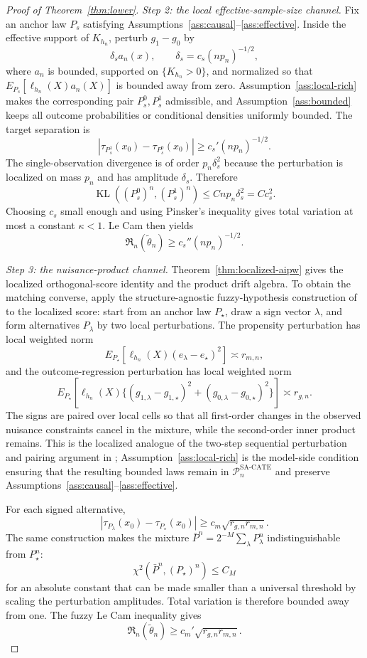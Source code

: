 \documentclass[11pt]{article}
\theoremstyle{definition}
\theoremstyle{plain}
\theoremstyle{remark}
\begin{document}
\begin{proof}[Proof of Theorem~\ref{thm:lower}]
\emph{Step 2: the local effective-sample-size channel.}
Fix an anchor law $P_s$ satisfying Assumptions~\ref{ass:causal}--\ref{ass:effective}. Inside the effective support of $K_{h_n}$, perturb $g_1-g_0$ by
\[
  \delta_s a_n(x),\qquad
  \delta_s=c_s(n p_n)^{-1/2},
\]
where $a_n$ is bounded, supported on $\{K_{h_n}>0\}$, and normalized so that
$E_{P_s}[\ell_{h_n}(X)a_n(X)]$ is bounded away from zero. Assumption~\ref{ass:local-rich} makes the corresponding pair $P_s^0,P_s^1$ admissible, and Assumption~\ref{ass:bounded} keeps all outcome probabilities or conditional densities uniformly bounded. The target separation is
\[
  |\tau_{P_s^1}(x_0)-\tau_{P_s^0}(x_0)|
  \ge c_s'(n p_n)^{-1/2}.
\]
The single-observation divergence is of order $p_n\delta_s^2$ because the perturbation is localized on mass $p_n$ and has amplitude $\delta_s$. Therefore
\[
  \operatorname{KL}\!\left((P_s^0)^n,(P_s^1)^n\right)
  \le C n p_n\delta_s^2
  = Cc_s^2 .
\]
Choosing $c_s$ small enough and using Pinsker's inequality gives total variation at most a constant $\kappa<1$. Le Cam then yields
\[
  \mathfrak R_n(\tilde\theta_n)\ge c_s''(n p_n)^{-1/2}.
\]

\emph{Step 3: the nuisance-product channel.}
Theorem~\ref{thm:localized-aipw} gives the localized orthogonal-score identity and the product drift algebra. To obtain the matching converse, apply the structure-agnostic fuzzy-hypothesis construction of \citet{JinSyrgkanis2025GeneralLinearFunctionalLowerBounds} to the localized score: start from an anchor law $P_\star$, draw a sign vector $\lambda$, and form alternatives $P_\lambda$ by two local perturbations. The propensity perturbation has local weighted norm
\[
  E_{P_\star}[\ell_{h_n}(X)(e_\lambda-e_\star)^2]\asymp r_{m,n},
\]
and the outcome-regression perturbation has local weighted norm
\[
  E_{P_\star}[\ell_{h_n}(X)\{(g_{1,\lambda}-g_{1,\star})^2+(g_{0,\lambda}-g_{0,\star})^2\}]
  \asymp r_{g,n}.
\]
The signs are paired over local cells so that all first-order changes in the observed nuisance constraints cancel in the mixture, while the second-order inner product remains. This is the localized analogue of the two-step sequential perturbation and pairing argument in \citet{JinSyrgkanis2025GeneralLinearFunctionalLowerBounds}; Assumption~\ref{ass:local-rich} is the model-side condition ensuring that the resulting bounded laws remain in $\mathcal{P}_n^{\mathrm{SA\text{-}CATE}}$ and preserve Assumptions~\ref{ass:causal}--\ref{ass:effective}.

For each signed alternative,
\[
  |\tau_{P_\lambda}(x_0)-\tau_{P_\star}(x_0)|
  \ge c_m\sqrt{r_{g,n}r_{m,n}} .
\]
The same construction makes the mixture $\bar P^n=2^{-M}\sum_\lambda P_\lambda^n$ indistinguishable from $P_\star^n$:
\[
  \chi^2(\bar P^n,(P_\star)^n)\le C_M
\]
for an absolute constant that can be made smaller than a universal threshold by scaling the perturbation amplitudes. Total variation is therefore bounded away from one. The fuzzy Le Cam inequality gives
\[
  \mathfrak R_n(\tilde\theta_n)\ge c_m'\sqrt{r_{g,n}r_{m,n}}.
\]


\end{proof}
\end{document}
